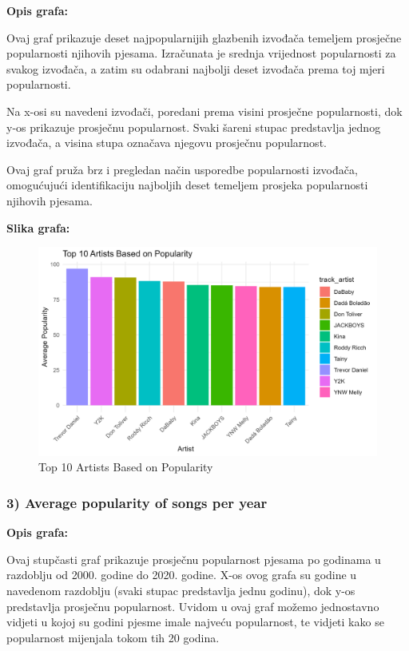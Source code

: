 	\textbf{Opis grafa:}
	
	Ovaj graf prikazuje deset najpopularnijih glazbenih izvođača temeljem prosječne popularnosti njihovih pjesama. Izračunata je srednja vrijednost popularnosti za svakog izvođača, a zatim su odabrani najbolji deset izvođača prema toj mjeri popularnosti.
	
	Na x-osi su navedeni izvođači, poredani prema visini prosječne popularnosti, dok y-os prikazuje prosječnu popularnost. Svaki šareni stupac predstavlja jednog izvođača, a visina stupa označava njegovu prosječnu popularnost.
	
	Ovaj graf pruža brz i pregledan način usporedbe popularnosti izvođača, omogućujući identifikaciju najboljih deset temeljem prosjeka popularnosti njihovih pjesama.
	
	\textbf{Slika grafa:}
	\begin{figure}[H]
		\includegraphics[scale=0.9]{slike/Top 10 popularity}
		\centering
		\caption{Top 10 Artists Based on Popularity}
		
	\end{figure}


	\subsubsection{3) Average popularity of songs per year}
	
	\textbf{Opis grafa:}
	
	Ovaj stupčasti graf prikazuje prosječnu popularnost pjesama po godinama u razdoblju od 2000. godine do 2020. godine. X-os ovog grafa su godine u navedenom razdoblju (svaki stupac predstavlja jednu godinu), dok y-os predstavlja prosječnu popularnost. 
	Uvidom u ovaj graf možemo jednostavno vidjeti u kojoj su godini pjesme imale najveću popularnost, te vidjeti kako se popularnost mijenjala tokom tih 20 godina.

